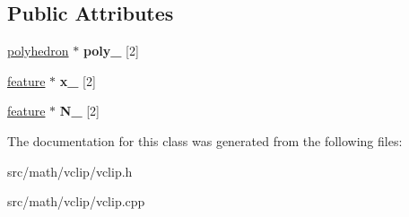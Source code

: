 \subsection*{Public Attributes}
\begin{DoxyCompactItemize}
\item 
\hypertarget{classvclip_a30004834c5276ea16cf7efcc6c9c986b}{
\hyperlink{classpolyhedron}{polyhedron} $\ast$ {\bfseries poly\_\-} \mbox{[}2\mbox{]}}
\label{classvclip_a30004834c5276ea16cf7efcc6c9c986b}

\item 
\hypertarget{classvclip_aebef7285e6233921964723547a7634e8}{
\hyperlink{classfeature}{feature} $\ast$ {\bfseries x\_\-} \mbox{[}2\mbox{]}}
\label{classvclip_aebef7285e6233921964723547a7634e8}

\item 
\hypertarget{classvclip_a79d13fa10a641a59d353b304ed32bd71}{
\hyperlink{classfeature}{feature} $\ast$ {\bfseries N\_\-} \mbox{[}2\mbox{]}}
\label{classvclip_a79d13fa10a641a59d353b304ed32bd71}

\end{DoxyCompactItemize}


The documentation for this class was generated from the following files:\begin{DoxyCompactItemize}
\item 
src/math/vclip/vclip.h\item 
src/math/vclip/vclip.cpp\end{DoxyCompactItemize}

